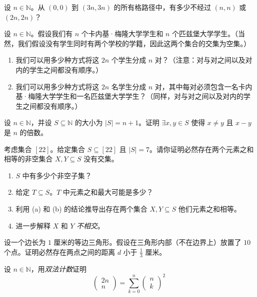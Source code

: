 \begin{exercise}
    设 $n \in \mathbb{N}$。从 $(0,0)$ 到 $(3n,3n)$ 的所有格路径中，有多少不经过 $(n,n)$ 或 $(2n,2n)$？
\end{exercise}

\begin{exercise}
    设 $n \in \mathbb{N}$。假设我们有 $n$ 个卡内基·梅隆大学学生和 $n$ 个匹兹堡大学学生。（当然，我们假设没有学生同时有两个学校的学籍，因此这两个集合的交集为空集。）
    \begin{enumerate}[label=(\alph*)]
        \item 我们可以用多少种方式将这 $2n$ 个学生分成 $n$ 对？（注意：对与对之间以及对内的学生之间都没有顺序。）
        \item 我们可以用多少种方式将这 $2n$ 名学生分成 $n$ 对，其中每对必须包含一名卡内基·梅隆大学学生和一名匹兹堡大学学生？（同样，对与对之间以及对内的学生之间都没有顺序。）
    \end{enumerate}
\end{exercise}

\begin{exercise}
    设 $n \in \mathbb{N}$，并设 $S \subseteq \mathbb{N}$ 的大小为 $|S|=n+1$。证明 $\exists x,y \in S$ 使得 $x \ne y$ 且 $x-y$ 是 $n$ 的倍数。
\end{exercise}

\begin{exercise}
    考虑集合 $[22]$。给定集合 $S \subseteq [22]$ 且 $|S|=7$。请你证明必然存在两个元素之和相等的非空集合 $X, Y \subseteq S$ 没有交集。
    \begin{enumerate}[label=(\alph*)]
        \item $S$ 中有多少个非空子集？
        \item 给定 $T \subseteq S$。$T$ 中元素之和最大可能是多少？
        \item 利用 (a) 和 (b) 的结论推导出存在两个集合 $X,Y \subseteq S$ 他们元素之和相等。
        \item 进一步解释 $X$ 和 $Y$ \emph{不相交}。
    \end{enumerate}
\end{exercise}

\begin{exercise}
    设一个边长为 $1$ 厘米的等边三角形。假设在三角形内部（不在边界上）放置了 $10$ 个点。证明必然存在两点之间的距离 $d$ 小于 $\frac{1}{3}$ 厘米。
\end{exercise}

\begin{exercise}
    设 $n \in \mathbb{N}$，用\emph{双法计数}证明
    \[\begin{pmatrix}2n\\n\end{pmatrix} = \sum_{k=0}^{n}\begin{pmatrix}n\\k\end{pmatrix}^2\]
\end{exercise}

